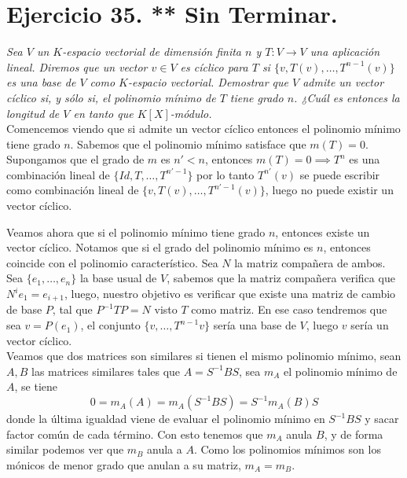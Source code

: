 \section{Ejercicio 35. ** Sin Terminar.} \textit{Sea \(V\) un \(K\)-espacio
  vectorial de dimensión finita \(n\) y \(T:V \to V\) una
  aplicación lineal. Diremos que un vector \(v \in V\) es cíclico para
  \(T\) si \(\{v, T(v), \dots, T^{n-1}(v)\}\) es una base de \(V\)
  como \(K\)-espacio vectorial. Demostrar que \(V\) admite un vector cíclico si,
  y sólo si, el polinomio mínimo de \(T\) tiene grado \(n\). ¿Cuál es entonces
  la longitud de \(V\) en tanto que \(K[X]\)-módulo.}\\


Comencemos viendo que si admite un vector cíclico entonces el polinomio mínimo
tiene grado \(n\). Sabemos que el polinomio mínimo satisface que \(m(T)=0\). Supongamos que el
grado de \(m\) es \(n' < n\),  entonces \(m(T)=0 \implies T^{n}\) es una
combinación lineal de \(\{Id,T,\dots,T^{n'-1}\}\) por lo tanto \(T^{n'}(v)\) se
puede escribir como combinación lineal de \(\{v,T(v),\dots,T^{n'-1}(v)\}\),
luego no puede existir un vector cíclico.\\



\noindent\makebox[\linewidth]{\rule{\paperwidth}{0.4pt}}

Veamos ahora que si el polinomio mínimo tiene grado \(n\), entonces existe un
vector cíclico. Notamos que si el grado del polinomio mínimo es \(n\), entonces
coincide con el polinomio característico. Sea \(N\) la matriz compañera de
ambos. Sea \(\{e_1,\dots,e_n\}\) la base usual de \(V\), sabemos que la matriz
compañera verifica que \(N^i e_1 = e_{i+1}\), luego, nuestro objetivo es
verificar que existe una matriz de cambio de base \(P\), tal que \(P^{-1}TP =
N\) visto \(T\) como matriz. En ese caso tendremos que sea \(v = P(e_1)\), el conjunto
\(\{v,\dots,T^{n-1}v\}\) sería una base de \(V\), luego \(v\) sería un vector
cíclico.\\

Veamos que dos matrices son similares si tienen el mismo polinomio mínimo, sean
\(A, B\) las matrices similares tales que \(A = S^{-1}BS\), sea \(m_A\) el
polinomio mínimo de \(A\), se tiene
\[
  0 = m_A(A) = m_A(S^{-1}BS) = S^{-1}m_A(B)S
\]
donde la última igualdad viene de evaluar el polinomio mínimo en \(S^{-1}BS\) y
sacar factor común de cada término. Con esto tenemos que \(m_A\) anula \(B\), y
de forma similar podemos ver que \(m_B\) anula a \(A\). Como los polinomios
mínimos son los mónicos de menor grado que anulan a su matriz, \(m_A = m_B\).\\

